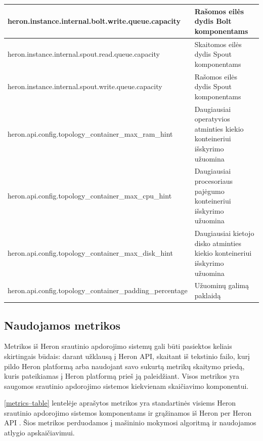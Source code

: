 \documentclass{VUMIFPSbakalaurinis}
\begin{document}
\begin{longtable}{|p{0.59\linewidth}|p{0.41\linewidth}|}
    heron.instance.internal.bolt.write.queue.capacity                     & Rašomos eilės dydis Bolt komponentams                                          \\ \hline
    heron.instance.internal.spout.read.queue.capacity                     & Skaitomos eilės dydis Spout komponentams                                       \\ \hline
    heron.instance.internal.spout.write.queue.capacity                    & Rašomos eilės dydis Spout komponentams                                         \\ \hline
    heron.api.config.topology\_container\_max\_ram\_hint                  & Daugiausiai operatyvios atminties kiekio konteineriui išskyrimo užuomina       \\ \hline
    heron.api.config.topology\_container\_max\_cpu\_hint                  & Daugiausiai procesoriaus pajėgumo konteineriui išskyrimo užuomina              \\ \hline
    heron.api.config.topology\_container\_max\_disk\_hint                 & Daugiausiai kietojo disko atminties kiekio konteineriui išskyrimo užuomina    \\ \hline
    heron.api.config.topology\_container\_padding\_percentage             & Užuominų galimą paklaidą                                                       \\ \hline
\end{longtable}

\subsection{Naudojamos metrikos}
Metrikos iš Heron srautinio apdorojimo sistemų gali būti pasiektos keliais skirtingais būdais: darant užklausą į Heron API, skaitant iš tekstinio failo, kurį pildo Heron platformą arba naudojant savo sukurtą metrikų skaitymo priedą, kuris pateikiamas į Heron platformą prieš ją paleidžiant. Visos metrikos yra saugomos srautinio apdorojimo sistemos kiekvienam skaičiavimo komponentui. 

\ref{metrics–table} lentelėje aprašytos metrikos yra standartinės visiems Heron srautinio apdorojimo sistemos komponentams ir grąžinamos iš Heron per Heron API \cite{heronTracker}. Šios metrikos perduodamos į mašininio mokymosi algoritmą ir naudojamos atlygio apskaičiavimui.
\end{document}
